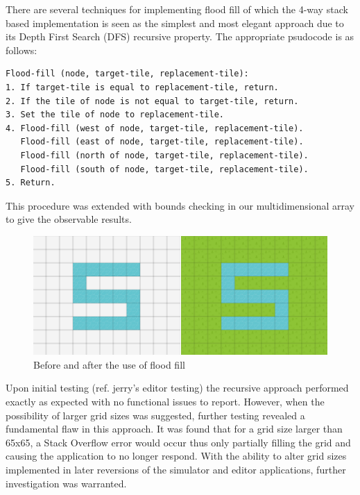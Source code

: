 There are several techniques for implementing flood fill of which the 4-way stack based implementation is seen as the simplest and most elegant approach due to its Depth First Search (DFS) recursive property. The appropriate psudocode is as follows:

\begin{minipage}{0.9\textwidth}
	\begin{lstlisting}[caption={4-way stack based recursive flood fill}, label={lst:stackFloodFill}]
Flood-fill (node, target-tile, replacement-tile):
1. If target-tile is equal to replacement-tile, return.
2. If the tile of node is not equal to target-tile, return.
3. Set the tile of node to replacement-tile.
4. Flood-fill (west of node, target-tile, replacement-tile).
   Flood-fill (east of node, target-tile, replacement-tile).
   Flood-fill (north of node, target-tile, replacement-tile).
   Flood-fill (south of node, target-tile, replacement-tile).
5. Return.
	\end{lstlisting}
\end{minipage}

This procedure was extended with bounds checking in our multidimensional array to give the observable results.

\begin{figure}[h]
	\begin{center}
		\includegraphics[scale=0.8]{img/floodFill.png}
		\caption[Flood Fill]{Before and after the use of flood fill}
	\label{fig:floodfill}
	\end{center}
\end{figure}

Upon initial testing (ref. jerry's editor testing) the recursive approach performed exactly as expected with no functional issues  to report.  However, when the possibility of larger grid sizes was suggested, further testing revealed a fundamental flaw in this approach.  It was found that for a grid size larger than 65x65, a Stack Overflow error would occur thus only partially filling the grid and causing the application to no longer respond.  With the ability to alter grid sizes implemented in later reversions of the simulator and editor applications, further investigation was warranted.

